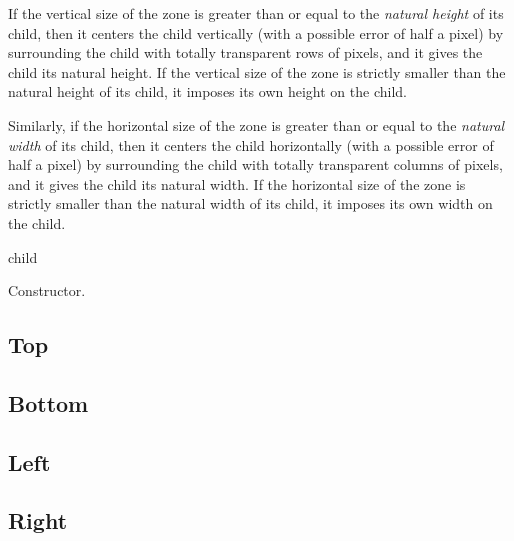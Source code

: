 If the vertical size of the  zone is greater than or
equal to the \emph{natural height} of its child, then it centers the
child vertically (with a possible error of half a pixel) by
surrounding the child with totally transparent rows of pixels, and it
gives the child its natural height.  If the vertical size of
the  zone is strictly smaller than the natural height of
its child, it imposes its own height on the child.

Similarly, if the horizontal size of the  zone is greater than or
equal to the \emph{natural width} of its child, then it centers the
child horizontally (with a possible error of half a pixel) by
surrounding the child with totally transparent columns of pixels, and it
gives the child its natural width.  If the horizontal size of
the  zone is strictly smaller than the natural width of
its child, it imposes its own width on the child.



 {\optional child}

Constructor. 

\subsection{Top}



\subsection{Bottom}



\subsection{Left}



\subsection{Right}




